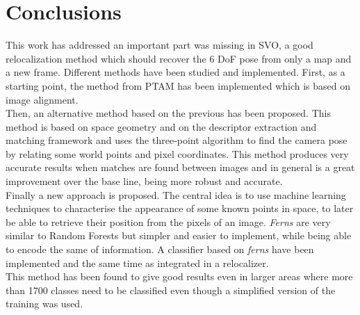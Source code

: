 
\section{Conclusions}
\label{sec:conclusins}

This work has addressed an important part was missing in SVO, a good relocalization method which should recover the 6 DoF pose from only a map and a new frame. Different methods have been studied and implemented. First, as a starting point, the method from PTAM has been implemented which is based on image alignment.\\

Then, an alternative method based on the previous has been proposed. This method is based on space geometry and on the descriptor extraction and matching framework and uses the three-point algorithm to find the camera pose by relating some world points and pixel coordinates. This method produces very accurate results when matches are found between images and in general is a great improvement over the base line, being more robust and accurate.\\


Finally a new approach is proposed. The central idea is to use machine learning techniques to characterise the appearance of some known points in space, to later be able to retrieve their position from the pixels of an image. \textit{Ferns} are very similar to Random Forests but simpler and easier to implement, while being able to encode the same of information. A classifier based on \textit{ferns} have been implemented and the same time as integrated in a relocalizer.\\

This method has been found to give good results even in larger areas where more than 1700 classes need to be classified even though a simplified version of the training was used.\\
